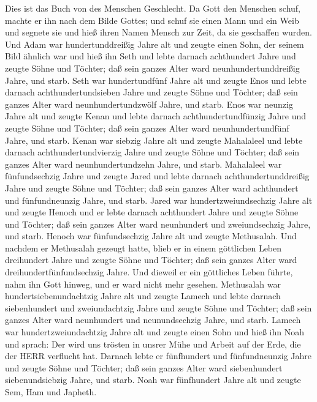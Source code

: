 Dies ist das Buch von des Menschen Geschlecht. Da Gott den
Menschen schuf, machte er ihn nach dem Bilde Gottes;  und
schuf sie einen Mann und ein Weib und segnete sie und hieß ihren Namen
Mensch zur Zeit, da sie geschaffen wurden.  Und Adam war
hundertunddreißig Jahre alt und zeugte einen Sohn, der seinem Bild
ähnlich war und hieß ihn Seth  und lebte darnach achthundert
Jahre und zeugte Söhne und Töchter;  daß sein ganzes Alter
ward neunhundertunddreißig Jahre, und starb.  Seth war
hundertundfünf Jahre alt und zeugte Enos  und lebte darnach
achthundertundsieben Jahre und zeugte Söhne und Töchter; 
daß sein ganzes Alter ward neunhundertundzwölf Jahre, und starb.
 Enos war neunzig Jahre alt und zeugte Kenan 
und lebte darnach achthundertundfünzig Jahre und zeugte Söhne und
Töchter;  daß sein ganzes Alter ward neunhundertundfünf
Jahre, und starb.  Kenan war siebzig Jahre alt und zeugte
Mahalaleel  und lebte darnach achthundertundvierzig Jahre
und zeugte Söhne und Töchter;  daß sein ganzes Alter ward
neunhundertundzehn Jahre, und starb.  Mahalaleel war
fünfundsechzig Jahre und zeugte Jared  und lebte darnach
achthundertunddreißig Jahre und zeugte Söhne und Töchter; 
daß sein ganzes Alter ward achthundert und fünfundneunzig Jahre, und
starb.  Jared war hundertzweiundsechzig Jahre alt und
zeugte Henoch  und er lebte darnach achthundert Jahre und
zeugte Söhne und Töchter;  daß sein ganzes Alter ward
neunhundert und zweiundsechzig Jahre, und starb.  Henoch
war fünfundsechzig Jahre alt und zeugte Methusalah.  Und
nachdem er Methusalah gezeugt hatte, blieb er in einem göttlichen Leben
dreihundert Jahre und zeugte Söhne und Töchter;  daß sein
ganzes Alter ward dreihundertfünfundsechzig Jahre.  Und
dieweil er ein göttliches Leben führte, nahm ihn Gott hinweg, und er
ward nicht mehr gesehen.  Methusalah war
hundertsiebenundachtzig Jahre alt und zeugte Lamech  und
lebte darnach siebenhundert und zweiundachtzig Jahre und zeugte Söhne
und Töchter;  daß sein ganzes Alter ward neunhundert und
neunundsechzig Jahre, und starb.  Lamech war
hundertzweiundachtzig Jahre alt und zeugte einen Sohn  und
hieß ihn Noah und sprach: Der wird uns trösten in unsrer Mühe und Arbeit
auf der Erde, die der HERR verflucht hat.  Darnach lebte er
fünfhundert und fünfundneunzig Jahre und zeugte Söhne und Töchter;
 daß sein ganzes Alter ward siebenhundert siebenundsiebzig
Jahre, und starb.  Noah war fünfhundert Jahre alt und
zeugte Sem, Ham und Japheth.

